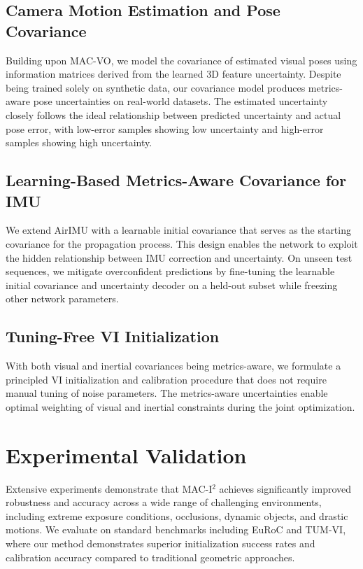 \subsection{Camera Motion Estimation and Pose Covariance}

Building upon MAC-VO, we model the covariance of estimated visual poses using information matrices derived from the learned 3D feature uncertainty. Despite being trained solely on synthetic data, our covariance model produces metrics-aware pose uncertainties on real-world datasets. The estimated uncertainty closely follows the ideal relationship between predicted uncertainty and actual pose error, with low-error samples showing low uncertainty and high-error samples showing high uncertainty.

\subsection{Learning-Based Metrics-Aware Covariance for IMU}

We extend AirIMU with a learnable initial covariance that serves as the starting covariance for the propagation process. This design enables the network to exploit the hidden relationship between IMU correction and uncertainty. On unseen test sequences, we mitigate overconfident predictions by fine-tuning the learnable initial covariance and uncertainty decoder on a held-out subset while freezing other network parameters.

\subsection{Tuning-Free VI Initialization}

With both visual and inertial covariances being metrics-aware, we formulate a principled VI initialization and calibration procedure that does not require manual tuning of noise parameters. The metrics-aware uncertainties enable optimal weighting of visual and inertial constraints during the joint optimization.

\section{Experimental Validation}

Extensive experiments demonstrate that MAC-I$^2$ achieves significantly improved robustness and accuracy across a wide range of challenging environments, including extreme exposure conditions, occlusions, dynamic objects, and drastic motions. We evaluate on standard benchmarks including EuRoC and TUM-VI, where our method demonstrates superior initialization success rates and calibration accuracy compared to traditional geometric approaches.

